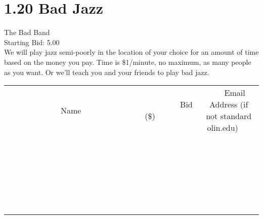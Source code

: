 \documentclass[11pt]{article}
\begin{document}
					\section*{1.20 Bad Jazz}
					The Bad Band \\
					Starting Bid: 5.00 \\
					We will play jazz semi-poorly in the location of your choice for an amount of time based on the money you pay.  Time is \$1/minute, no maximum, as many people as you want. Or we'll teach you and your friends to play bad jazz. \\
					[6ex]
					\begin{tabular}{c c c}
						~~~~~~~~~~~~~Name~~~~~~~~~~~~~ & ~~~~~~~~~Bid (\$)~~~~~~~~~ & ~~~Email Address (if not standard olin.edu)~~~ \\
				
 & & \\
\hline
 & & \\
\hline
 & & \\
\hline
 & & \\
\hline
 & & \\
\hline
 & & \\
\hline
 & & \\
\hline
 & & \\
\hline
 & & \\
\hline
 & & \\
\hline
 & & \\
\hline
 & & \\
\hline
 & & \\
\hline
 & & \\
\hline
 & & \\
\hline
 & & \\
\hline
 & & \\
\hline
 & & \\
\hline
 & & \\
\hline
 & & \\
\hline
 & & \\
\hline
 & & \\
\hline
 & & \\
\hline
 & & \\
\hline
 & & \\
\hline
 & & \\
\hline
					\end{tabular}
					\clearpage
				
\end{document}
